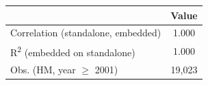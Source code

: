 \begin{tabular}{lc} \hline \hline
& \multicolumn{1}{c}{Value} \\ \toprule
Correlation (standalone, embedded) & 1.000 \\ 
R\textsuperscript{2} (embedded on standalone) & 1.000 \\ 
Obs. (HM, year $\geq$ 2001) &       19,023 \\ 
\bottomrule
\end{tabular}